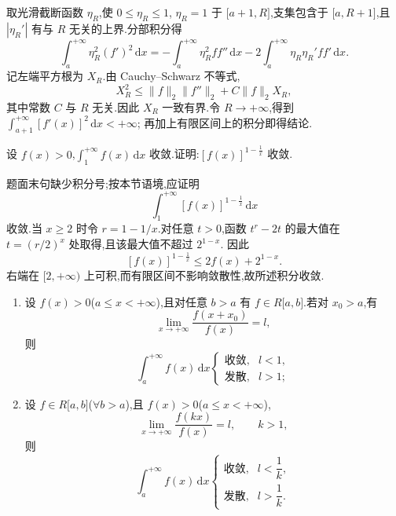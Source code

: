 \begin{solution}
  取光滑截断函数 $\eta_R$,使 $0\leq\eta_R\leq1$,
  $\eta_R=1$ 于 $\lbrack a+1,R\rbrack$,支集包含于
  $\lbrack a,R+1\rbrack$,且 $|\eta_R'|$ 有与 $R$ 无关的上界.分部积分得
  \[
    \int_a^{+\infty}\eta_R^2(f')^2\,\mathrm{d}x
    =-\int_a^{+\infty}\eta_R^2ff''\,\mathrm{d}x
    -2\int_a^{+\infty}\eta_R\eta_R'ff'\,\mathrm{d}x.
  \]
  记左端平方根为 $X_R$.由 Cauchy--Schwarz 不等式,
  \[
    X_R^2
    \leq\|f\|_2\|f''\|_2+C\|f\|_2X_R,
  \]
  其中常数 $C$ 与 $R$ 无关.因此 $X_R$ 一致有界.令 $R\to+\infty$,得到
  $\displaystyle\int_{a+1}^{+\infty}[f'(x)]^2\,\mathrm{d}x<+\infty$;
  再加上有限区间上的积分即得结论.
\end{solution}

\begin{example}
  设 $f(x)>0$,$\displaystyle\int_1^{+\infty}f(x)\,\mathrm{d}x$ 收敛.证明:$[f(x)]^{1-\frac{1}{x}}$ 收敛.
\end{example}
\exampleblank

\begin{solution}
  题面末句缺少积分号;按本节语境,应证明
  \[
    \int_1^{+\infty}[f(x)]^{1-\frac{1}{x}}\,\mathrm{d}x
  \]
  收敛.当 $x\geq2$ 时令 $r=1-1/x$.对任意 $t>0$,函数
  $t^r-2t$ 的最大值在 $t=(r/2)^x$ 处取得,且该最大值不超过 $2^{1-x}$.
  因此
  \[
    [f(x)]^{1-\frac{1}{x}}\leq2f(x)+2^{1-x}.
  \]
  右端在 $\lbrack2,+\infty)$ 上可积,而有限区间不影响敛散性,故所述积分收敛.
\end{solution}

\begin{example}
  \begin{enumerate}
    \item 设 $f(x)>0$($a\leq x<+\infty$),且对任意 $b>a$ 有 $f\in R\lbrack a,b\rbrack$.若对 $x_0>a$,有
          \[
            \lim\limits_{x\to+\infty}\dfrac{f(x+x_0)}{f(x)}=l,
          \]
          则
          \[
            \int_a^{+\infty}f(x)\,\mathrm{d}x
            \begin{cases}
              \text{收敛}, & l<1, \\
              \text{发散}, & l>1;
            \end{cases}
          \]
    \item 设 $f\in R\lbrack a,b\rbrack$($\forall b>a$),且 $f(x)>0$($a\leq x<+\infty$),
          \[
            \lim\limits_{x\to+\infty}\dfrac{f(kx)}{f(x)}=l,
            \qquad k>1,
          \]
          则
          \[
            \int_a^{+\infty}f(x)\,\mathrm{d}x
            \begin{cases}
              \text{收敛}, & l<\dfrac{1}{k}, \\
              \text{发散}, & l>\dfrac{1}{k}.
            \end{cases}
          \]
  \end{enumerate}
\end{example}
\exampleblank

